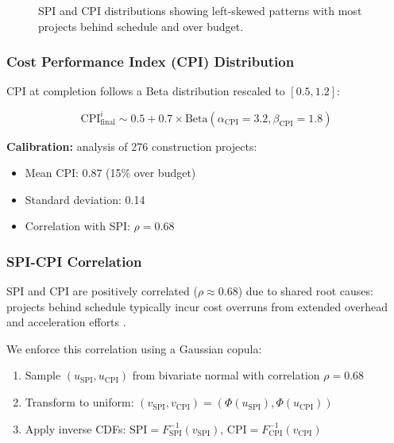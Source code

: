 \begin{figure}[h]
\centering
\resizebox{\columnwidth}{!}{}
\caption{SPI and CPI distributions showing left-skewed patterns with most projects behind schedule and over budget.}
\label{fig:spi_cpi_distributions}
\end{figure}

\subsubsection{Cost Performance Index (CPI) Distribution}

CPI at completion follows a Beta distribution rescaled to $[0.5, 1.2]$:

\begin{equation}
\text{CPI}_{\text{final}}^i \sim 0.5 + 0.7 \times \text{Beta}(\alpha_{\text{CPI}} = 3.2, \beta_{\text{CPI}} = 1.8)
\end{equation}

\textbf{Calibration:} \citet{love2016relationship} analysis of 276 construction projects:
\begin{itemize}
    \item Mean CPI: 0.87 (15\% over budget)
    \item Standard deviation: 0.14
    \item Correlation with SPI: $\rho = 0.68$
\end{itemize}

\subsubsection{SPI-CPI Correlation}

SPI and CPI are positively correlated ($\rho \approx 0.68$) due to shared root causes: projects behind schedule typically incur cost overruns from extended overhead and acceleration efforts \citep{love2016relationship}.

We enforce this correlation using a Gaussian copula:
\begin{enumerate}
    \item Sample $(u_{\text{SPI}}, u_{\text{CPI}})$ from bivariate normal with correlation $\rho = 0.68$
    \item Transform to uniform: $(v_{\text{SPI}}, v_{\text{CPI}}) = (\Phi(u_{\text{SPI}}), \Phi(u_{\text{CPI}}))$
    \item Apply inverse CDFs: $\text{SPI} = F_{\text{SPI}}^{-1}(v_{\text{SPI}})$, $\text{CPI} = F_{\text{CPI}}^{-1}(v_{\text{CPI}})$
\end{enumerate}

